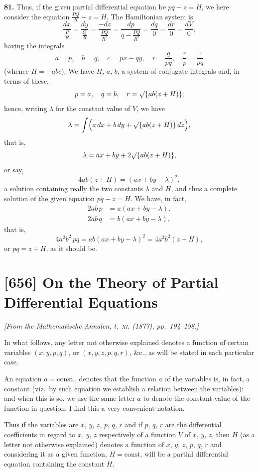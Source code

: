 \documentclass[11pt,a4paper]{article}
\theoremstyle{plain}
\theoremstyle{definition}
\begin{document}
\noindent\textbf{81.} Thus, if the given partial differential equation be $pq - z = H$, we here consider the equation $\frac{PQ}{R} - z = H$. The Hamiltonian system is
\[
\frac{dx}{\frac{P}{R}} = \frac{dy}{\frac{Q}{R}} = \frac{-dz}{\frac{PQ}{R^2}} = \frac{dp}{q - \frac{PQ}{R^2}} = \frac{dq}{0} = \frac{dr}{0} = \frac{dV}{0},
\]
having the integrals
\[
a = p, \quad b = q, \quad c = px - qy, \quad r = \frac{q}{pq}, \quad \frac{r}{p} = \frac{1}{pq}
\]
(whence $H = -abc$). We have $H$, $a$, $b$, a system of conjugate integrals and, in terms of these,
\[
p = a, \quad q = b, \quad r = \surd\{ab(z + H)\};
\]
hence, writing $\lambda$ for the constant value of $V$, we have
\[
\lambda = \int\Bigl(a\,dx + b\,dy + \surd\{ab(z + H)\}\,dz\Bigr),
\]
that is,
\[
\lambda = ax + by + 2\surd\{ab(z + H)\},
\]
or say,
\[
4ab(z + H) = (ax + by - \lambda)^2,
\]
a solution containing really the two constants $\lambda$ and $H$, and thus a complete solution of the given equation $pq - z = H$. We have, in fact,
\begin{align*}
2ab\,p &= a(ax + by - \lambda), \\
2ab\,q &= b(ax + by - \lambda),
\end{align*}
that is,
\[
4a^2b^2\,pq = ab(ax + by - \lambda)^2 = 4a^2b^2(z + H),
\]
or $pq = z + H$, as it should be.

\newpage
\section{[656] On the Theory of Partial Differential Equations}
\label{sec:656}

\noindent\textit{[From the \emph{Mathematische Annalen}, t.~\textsc{xi}. (1877), pp.~194--198.]}

\medskip

In what follows, any letter not otherwise explained denotes a function of certain variables $(x, y, p, q)$, or $(x, y, z, p, q, r)$, \&c., as will be stated in each particular case.

An equation $a = \text{const.}$, denotes that the function $a$ of the variables is, in fact, a constant (viz.~by such equation we establish a relation between the variables): and when this is so, we use the same letter $a$ to denote the constant value of the function in question; I find this a very convenient notation.

Thus if the variables are $x$, $y$, $z$, $p$, $q$, $r$ and if $p$, $q$, $r$ are the differential coefficients in regard to $x$, $y$, $z$ respectively of a function $V$ of $x$, $y$, $z$, then $H$ (as a letter not otherwise explained) denotes a function of $x$, $y$, $z$, $p$, $q$, $r$ and considering it as a given function, $H = \text{const.}$ will be a partial differential equation containing the constant $H$.
\end{document}
